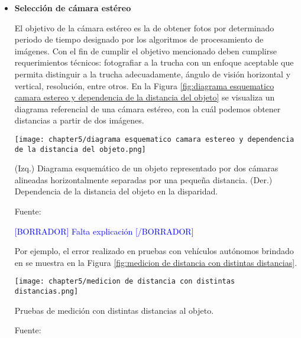 \begin{itemize}
	\item \textbf{Selección de cámara estéreo}
	
	El objetivo de la cámara estéreo es la de obtener fotos por determinado periodo de tiempo designado por los algoritmos de procesamiento de imágenes. Con el fin de cumplir el objetivo mencionado deben cumplirse requerimientos técnicos: fotografiar a la trucha con un enfoque aceptable que permita distinguir a la trucha adecuadamente, ángulo de visión horizontal y vertical, resolución, entre otros. En la Figura \ref{fig:diagrama esquematico camara estereo y dependencia de la distancia del objeto} se visualiza un diagrama referencial de una cámara estéreo, con la cuál podemos obtener distancias a partir de dos imágenes. 
	
	\begin{myfigure}[H]
		\centering
		\texttt{[image: chapter5/diagrama esquematico camara estereo y dependencia de la distancia del objeto.png]}
		\caption[Diagrama esquemático y dependencia de la distancia del objeto seguido por una cámara estéreo.]{(Izq.) Diagrama esquemático de un objeto representado por dos cámaras alineadas horizontalmente separadas por una pequeña distancia. (Der.) Dependencia de la distancia del objeto en la disparidad.}
		\begin{myflushleftportland}
			Fuente: \cite{Mahammed2013}
		\end{myflushleftportland}
		\label{fig:diagrama esquematico camara estereo y dependencia de la distancia del objeto}
	\end{myfigure}

	\textcolor{blue}{[BORRADOR] Falta explicación [/BORRADOR]}
	
	Por ejemplo, el error realizado en pruebas con vehículos autónomos brindado en \cite{Zaarane2020} se muestra en la Figura \ref{fig:medicion de distancia con distintas distancias}. 
	
	\begin{myfigure}[H]
		\centering
		\texttt{[image: chapter5/medicion de distancia con distintas distancias.png]}
		\caption{Pruebas de medición con distintas distancias al objeto.}
		\begin{myflushleftportland}
			Fuente: \cite{Zaarane2020}
		\end{myflushleftportland}
		\label{fig:medicion de distancia con distintas distancias}
	\end{myfigure}
		


\end{itemize}
